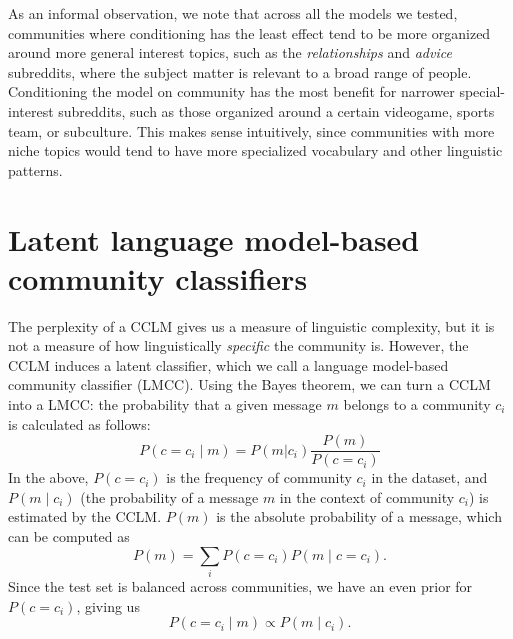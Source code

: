 \documentclass[11pt]{article}
\begin{document}
As an informal observation, we note that across all the models we
tested, communities where conditioning has the least effect tend to be
more organized around more general interest topics, such as the
\emph{relationships} and \emph{advice} subreddits, where the subject
matter is relevant to a broad range of people.  Conditioning the model
on community has the most benefit for narrower special-interest
subreddits, such as those organized around a certain videogame, sports
team, or subculture.  This makes sense intuitively, since communities
with more niche topics would tend to have more specialized vocabulary
and other linguistic patterns.

\section{Latent language model-based community classifiers}

The perplexity of a CCLM gives us a measure of linguistic complexity,
but it is not a measure of how linguistically \emph{specific} the
community is. However, the CCLM induces a latent classifier,
which we call a language model-based community classifier
(LMCC). Using the Bayes theorem, we can turn a
CCLM into a LMCC: the probability that a given message $m$
belongs to a community $c_i$ is calculated as follows:
\[P(c=c_i \mid m) = P(m | c_i)\frac {P(m)} {P(c=c_i)}\]
In the above,
$P(c=c_i)$ is the frequency of community $c_i$ in the dataset, and
$P(m \mid c_i)$ (the probability of a message $m$
in the context of community $c_i$) is estimated by the CCLM. 
$P(m)$ is the absolute
probability of a message, which can be computed as
\[P(m) = \sum_i P(c=c_i) P(m\mid c=c_i ). \]
Since the test set is balanced across communities,
we have an even prior for $P(c=c_i)$, giving us
\[P(c=c_i\mid m) \propto  P(m\mid c_i).\]
\end{document}

